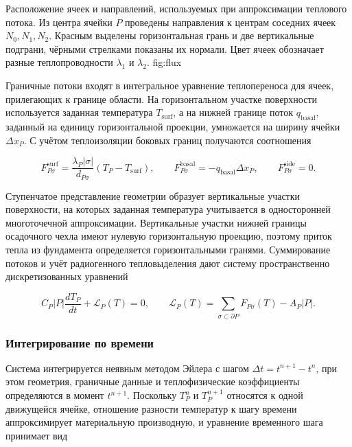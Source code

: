  {Расположение ячеек и направлений, используемых при аппроксимации теплового потока. Из центра ячейки $P$ проведены направления к центрам соседних ячеек $N_0,N_1,N_2$. Красным выделены горизонтальная грань и две вертикальные подграни, чёрными стрелками показаны их нормали. Цвет ячеек обозначает разные теплопроводности $\lambda_1$ и $\lambda_2$.} {fig:flux}

Граничные потоки входят в интегральное уравнение теплопереноса для ячеек, прилегающих к границе области. На горизонтальном участке поверхности используется заданная температура $T_{\mathrm{surf}}$, а на нижней границе поток $q_{\mathrm{basal}}$, заданный на единицу горизонтальной проекции, умножается на ширину ячейки $\Delta x_P$. С учётом теплоизоляции боковых границ получаются соотношения

\begin{equation}
 F_{P\sigma}^{\mathrm{surf}} = \frac{\lambda_P|\sigma|}{d_{P\sigma}}
                    (T_P - T_{\mathrm{surf}}),\qquad
 F_{P\sigma}^{\mathrm{basal}} = -q_{\mathrm{basal}}\Delta x_P,\qquad
 F_{P\sigma}^{\mathrm{side}} = 0.
\end{equation}

Ступенчатое представление геометрии образует вертикальные участки поверхности, на которых заданная температура учитывается в односторонней многоточечной аппроксимации. Вертикальные участки нижней границы осадочного чехла имеют нулевую горизонтальную проекцию, поэтому приток тепла из фундамента определяется горизонтальными гранями. Суммирование потоков и учёт радиогенного тепловыделения дают систему пространственно дискретизованных уравнений

\begin{equation}
 C_P|P|\frac{dT_P}{dt} + \mathcal L_P(T) = 0,\qquad
 \mathcal L_P(T) = \sum_{\sigma \subset \partial P} F_{P\sigma}(T) - A_P|P|.
\end{equation}

\subsubsection{Интегрирование по времени}

Система интегрируется неявным методом Эйлера с шагом $\Delta t=t^{n+1}-t^n$, при этом геометрия, граничные данные и теплофизические коэффициенты определяются в момент $t^{n+1}$. Поскольку $T_P^n$ и $T_P^{n+1}$ относятся к одной движущейся ячейке, отношение разности температур к шагу времени аппроксимирует материальную производную, и уравнение временного шага принимает вид

